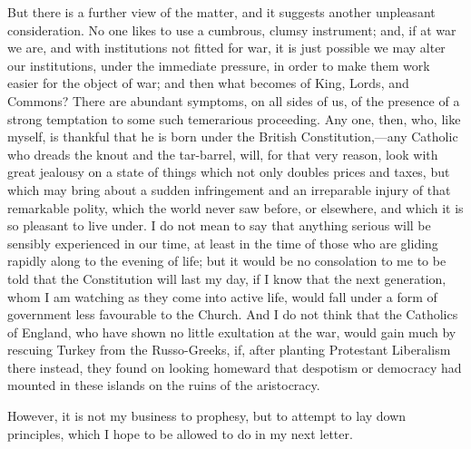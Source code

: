 But there is a further view of the matter, and it
suggests another unpleasant consideration. No one likes to use a
cumbrous, clumsy instrument; and, if at war we are, and with
institutions not fitted for war, it is just possible we may alter our
institutions, under the immediate pressure, in order to make them work
easier for the object of war; and then what becomes of King, Lords,
and Commons? There are abundant symptoms, on all sides of us, of the
presence of a strong temptation to some such temerarious proceeding.
Any one, then, who, like myself, is thankful that he is born under the
British Constitution,—any Catholic who dreads the knout and the
tar-barrel, will, for that very reason, look with great jealousy on a
state of things which not only doubles prices and taxes, but which may
bring about a sudden infringement and an irreparable injury of
that remarkable polity, which the world never saw before, or
elsewhere, and which it is so pleasant to live under. I do not mean to
say that anything serious will be sensibly experienced in our time, at
least in the time of those who are gliding rapidly along to the
evening of life; but it would be no consolation to me to be told that
the Constitution will last my day, if I know that the next generation,
whom I am watching as they come into active life, would fall under a
form of government less favourable to the Church. And I do not think
that the Catholics of England, who have shown no little exultation at
the war, would gain much by rescuing Turkey from the Russo-Greeks, if,
after planting Protestant Liberalism there instead, they found on
looking homeward that despotism or democracy had mounted in these
islands on the ruins of the aristocracy.

However, it is not my business to prophesy, but
to attempt to lay down principles, which I hope to be allowed to do in
my next letter.


